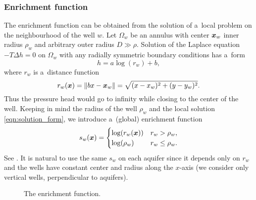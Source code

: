 \subsubsection{Enrichment function}
The enrichment function can be obtained from the solution of a~local problem on the neighbourhood of the well $w$.
Let $\Omega_w$ be an annulus with center $\mathbf{\boldsymbol{x}}_w$ inner radius $\rho_w$ and arbitrary outer radius $D \gg \rho$.
Solution of the Laplace equation $-T \Delta h = 0$ on $\Omega_w$ with any radially symmetric boundary conditions has a~form
%
\begin{equation} \label{eqn:solution_form}
  h = a \log(r_w)+b, %
\end{equation}
where $r_w$ is a~distance function
\begin{equation} \label{eqn:distance}
r_w(\mathbf{\boldsymbol{x}}) = \|\\bx - \mathbf{\boldsymbol{x}}_w\|= \sqrt{(x-x_w)^2+(y-y_w)^2}.
\end{equation}
%
Thus the pressure head would go to infinity while closing to the center of the well.
Keeping in mind the radius of the well $\rho_w$ and the local solution \eqref{eqn:solution_form}, 
we introduce a~(global) enrichment function
%
\begin{equation}
\label{eqn:enrich_func}
s_w(\mathbf{\boldsymbol{x}}) = 
  \begin{cases}
  \log(r_w(\mathbf{\boldsymbol{x}})) & r_w > \rho_w,\\
  \log(\rho_w) & r_w \le \rho_w.\\
  \end{cases}
\end{equation}
See .
It is natural to use the same $s_w$ on each aquifer since it depends only on $r_w$ and the wells have constant center and radius along the $x$-axis
(we consider only vertical wells, perpendicular to aquifers).
%

\begin{figure}[!htb]
  \begin{center}         
    \def\svgwidth{0.5\textwidth}
    
  \end{center}
  \caption{The enrichment function.}
  \label{fig:enrich_func}
\end{figure}


